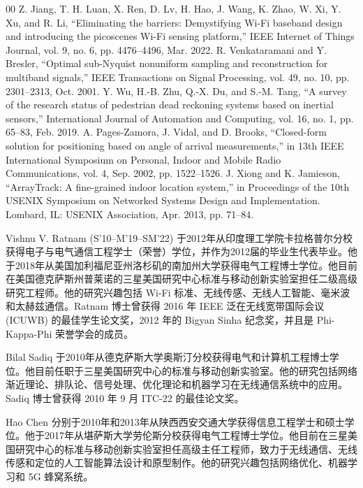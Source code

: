 \documentclass[journal]{IEEEtran}
\begin{document}
\begin{thebibliography}{00}
 Z. Jiang, T. H. Luan, X. Ren, D. Lv, H. Hao, J. Wang, K. Zhao, W. Xi, Y. Xu, and R. Li, “Eliminating the barriers: Demystifying Wi-Fi baseband design and introducing the picoscenes Wi-Fi sensing platform,” IEEE Internet of Things Journal, vol. 9, no. 6, pp. 4476–4496, Mar. 2022.
 R. Venkataramani and Y. Bresler, “Optimal sub-Nyquist nonuniform sampling and reconstruction for multiband signals,” IEEE Transactions on Signal Processing, vol. 49, no. 10, pp. 2301–2313, Oct. 2001.
 Y. Wu, H.-B. Zhu, Q.-X. Du, and S.-M. Tang, “A survey of the research status of pedestrian dead reckoning systems based on inertial sensors,” International Journal of Automation and Computing, vol. 16, no. 1, pp. 65–83, Feb. 2019.
 A. Pages-Zamora, J. Vidal, and D. Brooks, “Closed-form solution for positioning based on angle of arrival measurements,” in 13th IEEE International Symposium on Personal, Indoor and Mobile Radio Communications, vol. 4, Sep. 2002, pp. 1522–1526.
 J. Xiong and K. Jamieson, “ArrayTrack: A fine-grained indoor location system,” in Proceedings of the 10th USENIX Symposium on Networked Systems Design and Implementation. Lombard, IL: USENIX Association, Apr. 2013, pp. 71–84.
\end{thebibliography}

\begin{IEEEbiography}{Vishnu V. Ratnam} (S’10–M’19–SM’22) 于2012年从印度理工学院卡拉格普尔分校获得电子与电气通信工程学士（荣誉）学位，并作为2012届的毕业生代表毕业。他于2018年从美国加利福尼亚州洛杉矶的南加州大学获得电气工程博士学位。他目前在美国德克萨斯州普莱诺的三星美国研究中心标准与移动创新实验室担任二级高级研究工程师。他的研究兴趣包括 Wi-Fi 标准、无线传感、无线人工智能、毫米波和太赫兹通信。Ratnam 博士曾获得 2016 年 IEEE 泛在无线宽带国际会议 (ICUWB) 的最佳学生论文奖，2012 年的 Bigyan Sinha 纪念奖，并且是 Phi-Kappa-Phi 荣誉学会的成员。
\end{IEEEbiography}

\begin{IEEEbiography}{Bilal Sadiq} 于2010年从德克萨斯大学奥斯汀分校获得电气和计算机工程博士学位。他目前任职于三星美国研究中心的标准与移动创新实验室。他的研究包括网络渐近理论、排队论、信号处理、优化理论和机器学习在无线通信系统中的应用。Sadiq 博士曾获得 2010 年 9 月 ITC-22 的最佳论文奖。
\end{IEEEbiography}

\begin{IEEEbiography}{Hao Chen} 分别于2010年和2013年从陕西西安交通大学获得信息工程学士和硕士学位。他于2017年从堪萨斯大学劳伦斯分校获得电气工程博士学位。他目前在三星美国研究中心的标准与移动创新实验室担任高级主任工程师，致力于无线通信、无线传感和定位的人工智能算法设计和原型制作。他的研究兴趣包括网络优化、机器学习和 5G 蜂窝系统。
\end{IEEEbiography}
\end{document}
